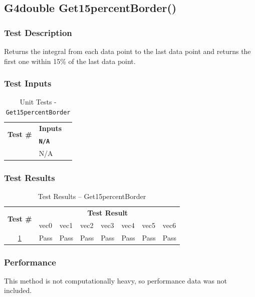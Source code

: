 \documentclass[12pt]{article}
\newcounter{TestCounter}
\begin{document}
\subsection{G4double Get15percentBorder()} %
	\subsubsection{Test Description}
	 Returns the integral from each data point to the last data point and returns the first one within 
15\% of the last data point.
	
	\subsubsection{Test Inputs}
		\begin{table}[H]
		\centering
		\caption{Unit Tests - \texttt{Get15percentBorder}}\label{Get15percentBorder_unit}
		\begin{tabular}{lll}
		\toprule
		\multirow{2}{*}{\bf Test \#}  & \multicolumn{1}{c}{\bf Inputs}\\
		& \bf \texttt{N/A}\\\midrule
		{TestCounter}\arabic{TestCounter}\label{Get15percentBorder_0} & N/A \\
		\bottomrule
		\end{tabular}
		\end{table}
	
	\subsubsection{Test Results}
		\begin{table}[H]
		\centering
		\caption{Test Results -- Get15percentBorder}\label{Get15percentBorder_acc}
		\begin{tabular}{clllllll}
		\toprule
		\multirow{2}{*}{\bf Test \#} & \multicolumn{7}{c}{\bf Test Result}\\
		& vec0 & vec1 & vec2 & vec3 & vec4 & vec5 & vec6\\\midrule
		\ref{Get15percentBorder_0} & Pass & Pass & Pass & Pass & Pass & Pass & Pass\\
		\bottomrule
		\end{tabular}
		\end{table}

	\subsubsection{Performance}
		This method is not computationally heavy, so performance data was not included.
		
\end{document}
